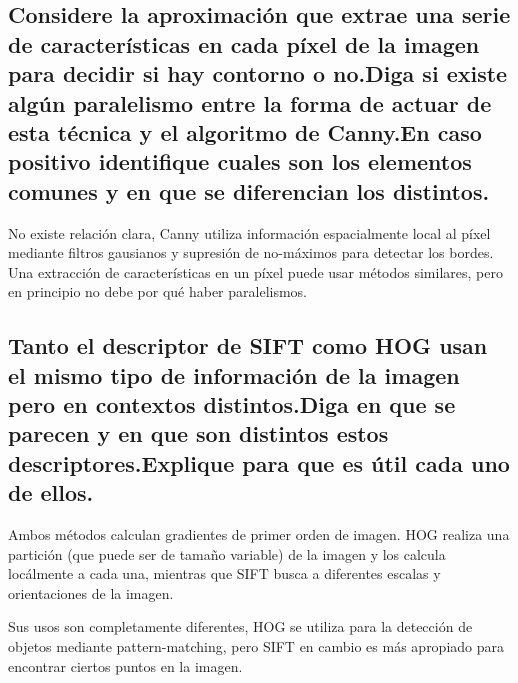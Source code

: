 \documentclass[11pt]{scrartcl} %
\begin{document}
\subsection{Considere la aproximación que extrae una serie de
características en cada píxel de la imagen para decidir si hay
contorno o no.\newline Diga si existe algún paralelismo entre la forma de
actuar de esta técnica y el algoritmo de Canny.\newline En caso positivo
identifique cuales son los elementos comunes y en que se diferencian
los distintos.}


No existe relación clara, Canny utiliza información espacialmente local al píxel 
mediante filtros gausianos y supresión de no-máximos para detectar los bordes.
Una extracción de características en un píxel puede usar métodos similares, pero
en principio no debe por qué haber paralelismos.

\subsection{Tanto el descriptor de SIFT como HOG usan el mismo tipo de
información de la imagen pero en contextos distintos.\newline Diga en que se
parecen y en que son distintos estos descriptores.\newline Explique para que
es útil cada uno de ellos.}


Ambos métodos calculan gradientes de primer orden de imagen.
HOG realiza una partición (que puede ser de tamaño variable) de la imagen y los calcula 
locálmente a cada una, mientras que SIFT busca a diferentes escalas y 
orientaciones de la imagen. \newline

Sus usos son completamente diferentes, HOG se utiliza para la detección de 
objetos mediante pattern-matching, pero SIFT en 
cambio es más apropiado para encontrar ciertos puntos en la imagen.

\end{document}
